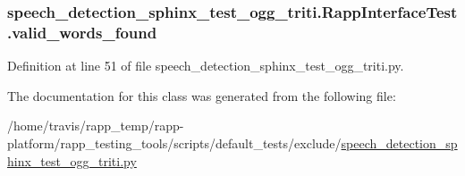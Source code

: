 \hypertarget{classspeech__detection__sphinx__test__ogg__triti_1_1RappInterfaceTest_ae3fe6a3bbd709b9c314aad0ab8368d2f}{
\subsubsection[{valid\-\_\-words\-\_\-found}]{\setlength{\rightskip}{0pt plus 5cm}speech\-\_\-detection\-\_\-sphinx\-\_\-test\-\_\-ogg\-\_\-triti.\-Rapp\-Interface\-Test.\-valid\-\_\-words\-\_\-found}}\label{classspeech__detection__sphinx__test__ogg__triti_1_1RappInterfaceTest_ae3fe6a3bbd709b9c314aad0ab8368d2f}


Definition at line 51 of file speech\-\_\-detection\-\_\-sphinx\-\_\-test\-\_\-ogg\-\_\-triti.\-py.



The documentation for this class was generated from the following file\-:\begin{DoxyCompactItemize}
\item 
/home/travis/rapp\-\_\-temp/rapp-\/platform/rapp\-\_\-testing\-\_\-tools/scripts/default\-\_\-tests/exclude/\hyperlink{speech__detection__sphinx__test__ogg__triti_8py}{speech\-\_\-detection\-\_\-sphinx\-\_\-test\-\_\-ogg\-\_\-triti.\-py}\end{DoxyCompactItemize}
